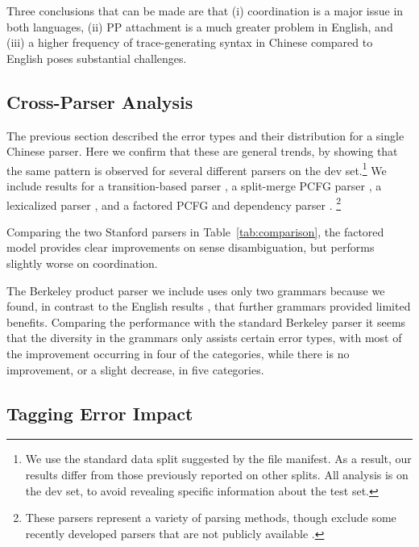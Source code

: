 Three conclusions that can be made are that (i) coordination is a major issue in
both languages, (ii) PP attachment is a much greater problem in English, and
(iii) a higher frequency of trace-generating
syntax in Chinese compared to English poses substantial challenges.

\subsection{Cross-Parser Analysis} \label{sec:cross_parser_analysis}
The previous section described the error types and their distribution for a single Chinese parser.
Here we confirm that these are general trends, by showing that the same pattern
is observed for several different parsers on the  dev set.\footnote{
    We use the standard data split suggested by the  file manifest.
    As a result, our results differ from those previously reported on other splits.
		All analysis is on the dev set, to avoid revealing specific information
		about the test set.
}
We include results for
a transition-based parser \parencite[ZPAR;][]{Zhang-Clark:2009:ICPT},
a split-merge PCFG parser \parencite{Petrov-etal:2006,Petrov-Klein:2007:NAACL,Petrov:2010:NAACLHLT},
a lexicalized parser \parencite{Bikel-Chiang:2000:CLP},
and a factored PCFG and dependency parser
\parencite{Levy-Manning:2003:ACL,Klein-Manning:2003:ACL,Klein-Manning:2002:NIPS}.
\footnote{These parsers represent a variety of parsing methods, though exclude
some recently developed parsers that are not publicly
available \parencite{Qian-Liu:2012:EMNLP,Xiong-etal:2005:IJCNLP}.}

Comparing the two Stanford parsers in Table~\ref{tab:comparison}, the factored
model provides clear improvements on sense disambiguation, but performs
slightly worse on coordination.

The Berkeley product parser we include uses only two grammars because we found,
in contrast to the English results \parencite{Petrov:2010:NAACLHLT}, that further
grammars provided limited benefits.  Comparing the performance with the
standard Berkeley parser it seems that the diversity in the grammars only
assists certain error types, with most of the improvement occurring in four of
the categories, while there is no improvement, or a slight decrease, in five categories.

\subsection{Tagging Error Impact} \label{sec:pos_ablation_study}

